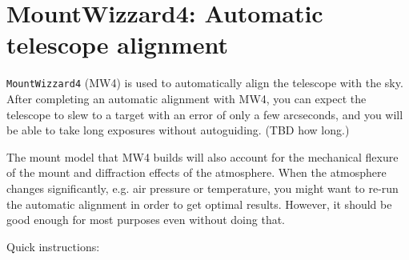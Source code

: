 \documentclass[a4paper, 11pt, fleqn]{memoir}
\begin{document}
\section{MountWizzard4: Automatic telescope alignment}

\texttt{MountWizzard4} (MW4) is used to automatically align the telescope with the sky.
After completing an automatic alignment with MW4, you can expect the telescope to slew to a target with an error of only a few arcseconds, and you will be able to take long exposures without autoguiding.
(TBD how long.)

The mount model that MW4 builds will also account for the mechanical flexure of the mount and diffraction effects of the atmosphere.
When the atmosphere changes significantly, e.g. air pressure or temperature, you might want to re-run the automatic alignment in order to get optimal results.
However, it should be good enough for most purposes even without doing that.

Quick instructions:
\end{document}
